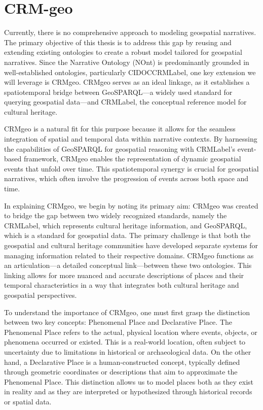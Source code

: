 \section{CRM-geo}\label{III-sec:crmgeo}

Currently, there is no comprehensive approach to modeling geospatial narratives. The primary objective of this thesis is to address this gap by reusing and extending existing ontologies to create a robust model tailored for geospatial narratives. Since the Narrative Ontology (NOnt) is predominantly grounded in well-established ontologies, particularly \acrfull{CIDOCCRMLabel}, one key extension we will leverage is CRMgeo. CRMgeo serves as an ideal linkage, as it establishes a spatiotemporal bridge between GeoSPARQL—a widely used standard for querying geospatial data—and \acrshort{CRMLabel}, the conceptual reference model for cultural heritage.

CRMgeo \cite{doerrCRMgeoLinkingCIDOC} is a natural fit for this purpose because it allows for the seamless integration of spatial and temporal data within narrative contexts. By harnessing the capabilities of GeoSPARQL for geospatial reasoning with \acrshort{CRMLabel}'s event-based framework, CRMgeo enables the representation of dynamic geospatial events that unfold over time. This spatiotemporal synergy is crucial for geospatial narratives, which often involve the progression of events across both space and time.

In explaining CRMgeo, we begin by noting its primary aim: CRMgeo was created to bridge the gap between two widely recognized standards, namely the \acrshort{CRMLabel}, which represents cultural heritage information, and GeoSPARQL, which is a standard for geospatial data. The primary challenge is that both the geospatial and cultural heritage communities have developed separate systems for managing information related to their respective domains. CRMgeo functions as an articulation—a detailed conceptual link—between these two ontologies. This linking allows for more nuanced and accurate descriptions of places and their temporal characteristics in a way that integrates both cultural heritage and geospatial perspectives.

To understand the importance of CRMgeo, one must first grasp the distinction between two key concepts: Phenomenal Place and Declarative Place. The Phenomenal Place refers to the actual, physical location where events, objects, or phenomena occurred or existed. This is a real-world location, often subject to uncertainty due to limitations in historical or archaeological data. On the other hand, a Declarative Place is a human-constructed concept, typically defined through geometric coordinates or descriptions that aim to approximate the Phenomenal Place. This distinction allows us to model places both as they exist in reality and as they are interpreted or hypothesized through historical records or spatial data.

